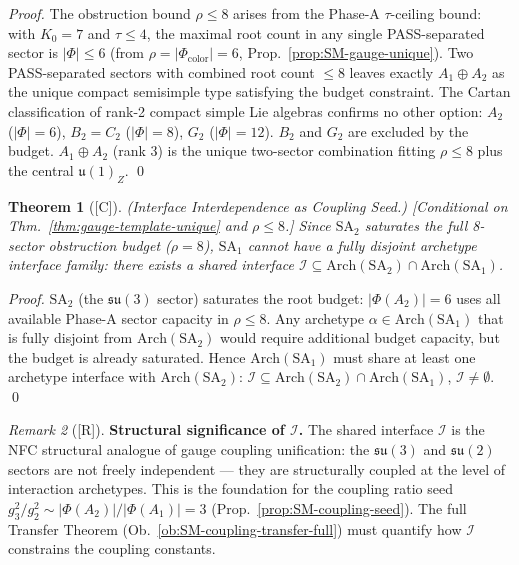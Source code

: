 \documentclass[12pt,oneside]{amsbook}
\theoremstyle{plain}
\newtheorem{theorem}{Theorem}[section]
\theoremstyle{definition}
\theoremstyle{remark}
\newtheorem{remark}[theorem]{Remark}
\newcommand{\status}[1]{\textup{[#1]}}
\begin{document}
\begin{proof}
The obstruction bound $\rho \leq 8$ arises from the Phase-A
$\tau$-ceiling bound: with $K_0=7$ and $\tau \leq 4$, the maximal
root count in any single PASS-separated sector is
$|\Phi| \leq 6$ (from $\rho = |\Phi_{\mathrm{color}}| = 6$,
Prop.~\ref{prop:SM-gauge-unique}). Two PASS-separated sectors with
combined root count $\leq 8$ leaves exactly $A_1 \oplus A_2$ as the
unique compact semisimple type satisfying the budget constraint.
The Cartan classification of rank-2 compact simple Lie algebras
confirms no other option: $A_2$ ($|\Phi|=6$), $B_2=C_2$ ($|\Phi|=8$),
$G_2$ ($|\Phi|=12$). $B_2$ and $G_2$ are excluded by the budget.
$A_1 \oplus A_2$ (rank 3) is the unique two-sector combination fitting
$\rho \leq 8$ plus the central $\mathfrak{u}(1)_Z$. \qed
\end{proof}

\begin{theorem}[\status{C}]\label{thm:interface-shared}
\textup{(Interface Interdependence as Coupling Seed.)}
\textup{[Conditional on Thm.~\ref{thm:gauge-template-unique} and $\rho
\leq 8$.]}
Since $\mathrm{SA}_2$ saturates the full 8-sector obstruction budget
($\rho = 8$), $\mathrm{SA}_1$ cannot have a fully disjoint archetype
interface family: there exists a shared interface
$\mathcal{I} \subseteq \mathrm{Arch}(\mathrm{SA}_2) \cap
\mathrm{Arch}(\mathrm{SA}_1)$.
\end{theorem}

\begin{proof}
$\mathrm{SA}_2$ (the $\mathfrak{su}(3)$ sector) saturates the root
budget: $|\Phi(A_2)| = 6$ uses all available Phase-A sector capacity
in $\rho \leq 8$. Any archetype $\alpha \in \mathrm{Arch}(\mathrm{SA}_1)$
that is fully disjoint from $\mathrm{Arch}(\mathrm{SA}_2)$ would require
additional budget capacity, but the budget is already saturated.
Hence $\mathrm{Arch}(\mathrm{SA}_1)$ must share at least one archetype
interface with $\mathrm{Arch}(\mathrm{SA}_2)$:
$\mathcal{I} \subseteq \mathrm{Arch}(\mathrm{SA}_2) \cap
\mathrm{Arch}(\mathrm{SA}_1)$, $\mathcal{I} \neq \emptyset$. \qed
\end{proof}

\begin{remark}[\status{R}]
\textbf{Structural significance of $\mathcal{I}$.}
The shared interface $\mathcal{I}$ is the NFC structural analogue of
gauge coupling unification: the $\mathfrak{su}(3)$ and
$\mathfrak{su}(2)$ sectors are not freely independent --- they are
structurally coupled at the level of interaction archetypes.
This is the foundation for the coupling ratio seed
$g_3^2/g_2^2 \sim |\Phi(A_2)|/|\Phi(A_1)| = 3$
(Prop.~\ref{prop:SM-coupling-seed}).
The full Transfer Theorem (Ob.~\ref{ob:SM-coupling-transfer-full})
must quantify how $\mathcal{I}$ constrains the coupling constants.
\end{remark}
\end{document}
